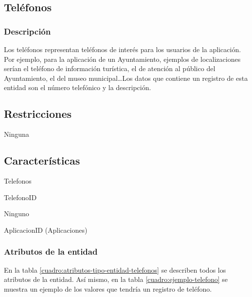 \subsection{Teléfonos}

\subsubsection*{Descripción}
Los teléfonos representan teléfonos de interés para los usuarios de la aplicación. Por ejemplo, para la aplicación de un Ayuntamiento, ejemplos de localizaciones serían el teléfono de información turística, el de atención al público del Ayuntamiento, el del museo municipal\dots Los datos que contiene un registro de esta entidad son el número telefónico y la descripción.

\subsection*{Restricciones}
Ninguna

\subsection*{Características}
\begin{description}[nosep,style=multiline,labelindent=0.8cm,leftmargin=4.5cm,font=\normalfont]
    \item[Nombre] Telefonos
    \item[Id. principal] TelefonoID
    \item[Id. alternativo] Ninguno
    \item[Atrib. heredados] AplicacionID (Aplicaciones)
\end{description}

\subsubsection*{Atributos de la entidad}
En la tabla \ref{cuadro:atributos-tipo-entidad-telefonos} se describen todos los atributos de la entidad. Así mismo, en la tabla \ref{cuadro:ejemplo-telefono} se muestra un ejemplo de los valores que tendría un registro de teléfono.

